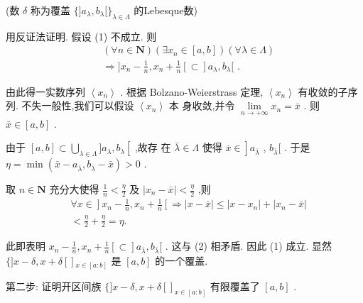 (数 $\delta$ 称为覆盖 $\{ \rbrack {a}_{\lambda },{b}_{\lambda }\lbrack {\} }_{\lambda  \in  \Lambda }$ 的Lebesque数)

用反证法证明. 假设 (1) 不成立. 则
\begin{align*}
	&\left( {\forall n \in  \mathbf{N}}\right) \left( {\exists {x}_{n} \in  \left\lbrack  {a,b}\right\rbrack  }\right) \left( {\forall \lambda  \in  \Lambda }\right)\\
	&\Rightarrow  \rbrack {x}_{n} - \frac{1}{n},{x}_{n} + \frac{1}{n}\left\lbrack   \subset  \right\rbrack  {a}_{\lambda },{b}_{\lambda }\lbrack \text{ . } 
\end{align*}

由此得一实数序列 $\left\langle  {x}_{n}\right\rangle$ . 根据 Bolzano-Weierstrass 定理, $\left\langle  {x}_{n}\right\rangle$ 有收敛的子序列. 不失一般性,我们可以假设 $\left\langle  {x}_{n}\right\rangle$ 本 身收敛,并令 $\mathop{\lim }\limits_{{n \rightarrow   + \infty }}{x}_{n} = \bar{x}$ . 则 $\bar{x} \in  \left\lbrack  {a,b}\right\rbrack$ .

由于 $\left\lbrack  {a,b}\right\rbrack   \subset  \mathop{\bigcup }\limits_{{\lambda  \in  \Lambda }}\rbrack {a}_{\lambda },{b}_{\lambda }\left\lbrack  {\text{ ,故存 在 }\bar{\lambda } \in  \Lambda \text{ 使得 }\bar{x} \in  }\right\rbrack  {a}_{\bar{\lambda }}$ , ${b}_{\bar{\lambda }}\lbrack$ . 于是 $\eta  = \min \left( {\bar{x} - {a}_{\bar{\lambda }},{b}_{\bar{\lambda }} - \bar{x}}\right)  > 0$ .

取 $n \in  \mathbf{N}$ 充分大使得 $\frac{1}{n} < \frac{\eta }{2}$ 及 $\left| {{x}_{n} - \bar{x}}\right|  < \frac{\eta }{2}$ ,则
\begin{align*}
	&\left. {\forall x \in  }\right\rbrack  {x}_{n} - \frac{1}{n},{x}_{n} + \frac{1}{n}\left\lbrack  { \Rightarrow  \left| {x - \bar{x}}\right|  \leq  \left| {x - {x}_{n}}\right|  + \left| {{x}_{n} - \bar{x}}\right| }\right.\\
	&< \frac{\eta }{2} + \frac{\eta }{2} = \eta .
\end{align*}

此即表明 ${x}_{n} - \frac{1}{n},{x}_{n} + \frac{1}{n}\left\lbrack   \subset  \right\rbrack  {a}_{\bar{\lambda }},{b}_{\bar{\lambda }}\lbrack$ . 这与 (2) 相矛盾. 因此 (1) 成立. 显然 $\{ \rbrack x - \delta ,x + \delta \left\lbrack  \right\rbrack  {}_{x \in  \left\lbrack  {a : b}\right\rbrack  }$ 是 $\left\lbrack  {a,b}\right\rbrack$ 的一个覆盖.

第二步: 证明开区间族 $\{ \rbrack x - \delta ,x + \delta {\left\lbrack  \right\rbrack  }_{x \in  \left\lbrack  {a : b}\right\rbrack  }$ 有限覆盖了 $\left\lbrack  {a,b}\right\rbrack$ .

